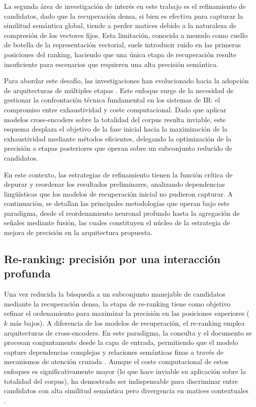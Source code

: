 \noindent La segunda área de investigación de interés en este trabajo es el refinamiento de candidatos, dado que la recuperación densa, si bien es efectiva para capturar la similitud semántica global, tiende a perder matices debido a la naturaleza de compresión de los vectores fijos. Esta limitación, conocida a menudo como cuello de botella de la representación vectorial, suele introducir ruido en las primeras posiciones del ranking, haciendo que una única etapa de recuperación resulte insuficiente para escenarios que requieren una alta precisión semántica.

Para abordar este desafío, las investigaciones han evolucionado hacia la adopción de arquitecturas de múltiples etapas \cite{borges2021assessing}. Este enfoque surge de la necesidad de gestionar la confrontación técnica fundamental en los sistemas de \gls{IR}: el compromiso entre exhaustividad y coste computacional. Dado que aplicar modelos cross-encoders sobre la totalidad del corpus resulta inviable, este esquema desplaza el objetivo de la fase inicial hacia la maximización de la exhaustividad mediante métodos eficientes, delegando la optimización de la precisión a etapas posteriores que operan sobre un subconjunto reducido de candidatos.

En este contexto, las estrategias de refinamiento tienen la función crítica de depurar y reordenar los resultados preliminares, analizando dependencias lingüísticas que los modelos de recuperación inicial no pudieron capturar. A continuación, se detallan las principales metodologías que operan bajo este paradigma, desde el reordenamiento neuronal profundo hasta la agregación de señales mediante fusión, las cuales constituyen el núcleo de la estrategia de mejora de precisión en la arquitectura propuesta.

\subsection{Re-ranking: precisión por una interacción profunda}

\noindent Una vez reducida la búsqueda a un subconjunto manejable de candidatos mediante la recuperación densa, la etapa de re-ranking tiene como objetivo refinar el ordenamiento para maximizar la precisión en las posiciones superiores ($k$ más bajos). A diferencia de los modelos de recuperación, el re-ranking emplea arquitecturas de cross-encoders. En este paradigma, la consulta y el documento se procesan conjuntamente desde la capa de entrada, permitiendo que el modelo capture dependencias complejas y relaciones semánticas finas a través de mecanismos de atención cruzada \cite{guo2016deep,nogueira2019passage}. Aunque el coste computacional de estos enfoques es significativamente mayor (lo que hace inviable su aplicación sobre la totalidad del corpus), ha demostrado ser indispensable para discriminar entre candidatos con alta similitud semántica pero divergencia en matices contextuales \cite{humeau2019poly}.

